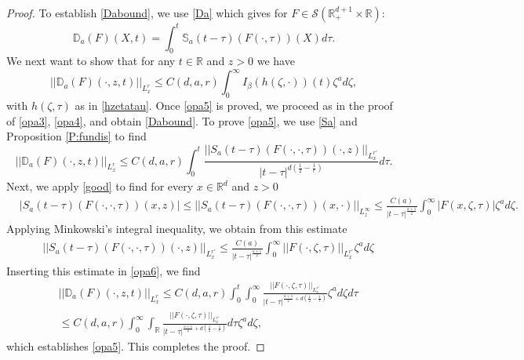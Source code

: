 \documentclass[11pt,letter]{amsart}
\def \RN {\mathbb{R}_+^{d+1}}
\def \R {\mathbb{R}}
\newcommand{\Rd}{\mathbb R^d}
\numberwithin{equation}{section}
\numberwithin{equation}{section}
\begin{document}
\begin{proof}
To establish \eqref{Dabound}, we use \eqref{Da} which gives for $F\in \mathscr S(\RN\times \R)$:
\begin{equation}\label{Daa}
\mathbb D_a(F)(X,t) = \int_0^t \mathbb S_a(t-\tau)(F(\cdot,\tau))(X) d\tau.
\end{equation}
We next want to show that for any $t\in \R$ and $z>0$ we have
\begin{equation}\label{opa5}
||\mathbb D_a(F)(\cdot,z,t)||_{L^r_x} \le C(d,a,r) \int_0^\infty I_\beta(h(\zeta,\cdot))(t) \zeta^a d\zeta, 
\end{equation}
with $h(\zeta,\tau)$ as in \eqref{hzetatau}. Once \eqref{opa5} is proved, we proceed as in the proof of \eqref{opa3}, \eqref{opa4}, and obtain \eqref{Dabound}. To prove \eqref{opa5}, we use \eqref{Sa} and Proposition \ref{P:fundis} to find
\begin{equation}\label{opa6}
||\mathbb D_a(F)(\cdot,z,t)||_{L^r_x} \le C(d,a,r) \int_0^t \frac{||S_a(t-\tau)(F(\cdot,\cdot,\tau))(\cdot,z)||_{L^{r'}_x}}{|t-\tau|^{d(\frac 12 - \frac 1r)}} d\tau.
\end{equation}
Next, we apply \eqref{good} to find for every $x\in \Rd$ and $z>0$
\begin{align*}
& |S_a(t-\tau)(F(\cdot,\cdot,\tau))(x,z)| \le ||S_a(t-\tau)(F(\cdot,\cdot,\tau))(x,\cdot)||_{L^\infty_z} \le \frac{C(a)}{|t-\tau|^{\frac{a+1}2}} \int_0^\infty |F(x,\zeta,\tau)| \zeta^a d\zeta.
\end{align*}
Applying Minkowski's integral inequality, we obtain from this estimate
\begin{align*}
& ||S_a(t-\tau)(F(\cdot,\cdot,\tau))(\cdot,z)||_{L^{r'}_x} \le \frac{C(a)}{|t-\tau|^{\frac{a+1}2}} \int_0^\infty ||F(\cdot,\zeta,\tau)||_{L^{r'}_x} \zeta^a d\zeta
\end{align*}
Inserting this estimate in \eqref{opa6}, we find
\begin{align*}
& ||\mathbb D_a(F)(\cdot,z,t)||_{L^r_x} \le C(d,a,r) \int_0^t \int_0^\infty \frac{||F(\cdot,\zeta,\tau)||_{L^{r'}_x}}{|t-\tau|^{\frac{a+1}2 + d(\frac 12 - \frac 1r)}} \zeta^a d\zeta d\tau
\\
& \le C(d,a,r)  \int_0^\infty \int_\R \frac{||F(\cdot,\zeta,\tau)||_{L^{r'}_x}}{|t-\tau|^{\frac{a+1}2 + d(\frac 12 - \frac 1r)}} d\tau \zeta^a d\zeta,
\end{align*}
which establishes \eqref{opa5}. This completes the proof.

\end{proof}
\end{document}
